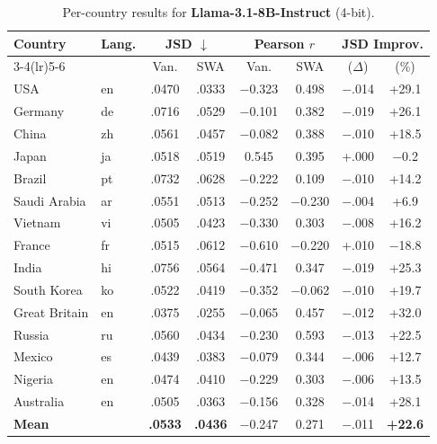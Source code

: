 \documentclass{article}
\newcommand{\gain}[1]{\textcolor{improvegreen}{#1}}
\newcommand{\loss}[1]{\textcolor{worsered}{#1}}
\begin{document}
\begin{table}[h]
\caption{Per-country results for \textbf{Llama-3.1-8B-Instruct} (4-bit).}
\label{tab:llama8b_percountry}
\centering\setlength{\tabcolsep}{3.5pt}\footnotesize
\begin{tabular}{llcccccc}
\toprule
Country & Lang. & \multicolumn{2}{c}{JSD $\downarrow$} & \multicolumn{2}{c}{Pearson $r$} & \multicolumn{2}{c}{JSD Improv.} \\
\cmidrule(lr){3-4}\cmidrule(lr){5-6}
 & & Van. & SWA & Van. & SWA & ($\Delta$) & (\%) \\
\midrule
USA         & en & .0470 & .0333 & $-$0.323 & 0.498 & $-$.014 & \gain{+29.1} \\
Germany     & de & .0716 & .0529 & $-$0.101 & 0.382 & $-$.019 & \gain{+26.1} \\
China       & zh & .0561 & .0457 & $-$0.082 & 0.388 & $-$.010 & \gain{+18.5} \\
Japan       & ja & .0518 & .0519 & 0.545 & 0.395 & +.000 & \loss{$-$0.2} \\
Brazil      & pt & .0732 & .0628 & $-$0.222 & 0.109 & $-$.010 & \gain{+14.2} \\
Saudi Arabia& ar & .0551 & .0513 & $-$0.252 & $-$0.230 & $-$.004 & \gain{+6.9} \\
Vietnam     & vi & .0505 & .0423 & $-$0.330 & 0.303 & $-$.008 & \gain{+16.2} \\
France      & fr & .0515 & .0612 & $-$0.610 & $-$0.220 & +.010 & \loss{$-$18.8} \\
India       & hi & .0756 & .0564 & $-$0.471 & 0.347 & $-$.019 & \gain{+25.3} \\
South Korea & ko & .0522 & .0419 & $-$0.352 & $-$0.062 & $-$.010 & \gain{+19.7} \\
Great Britain& en& .0375 & .0255 & $-$0.065 & 0.457 & $-$.012 & \gain{+32.0} \\
Russia      & ru & .0560 & .0434 & $-$0.230 & 0.593 & $-$.013 & \gain{+22.5} \\
Mexico      & es & .0439 & .0383 & $-$0.079 & 0.344 & $-$.006 & \gain{+12.7} \\
Nigeria     & en & .0474 & .0410 & $-$0.229 & 0.303 & $-$.006 & \gain{+13.5} \\
Australia   & en & .0505 & .0363 & $-$0.156 & 0.328 & $-$.014 & \gain{+28.1} \\
\midrule
\textbf{Mean} & & \textbf{.0533} & \textbf{.0436} & $-$0.247 & 0.271 & $-$.011 & \gain{\textbf{+22.6}} \\
\bottomrule
\end{tabular}
\end{table}
\end{document}
